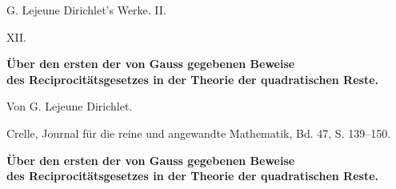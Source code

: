 \documentclass[11pt]{article}
\begin{document}
\begin{center}
{\Large G. Lejeune Dirichlet's Werke. II.}\par\vspace{1.2em}
{\Large XII.}\par\vspace{0.5em}
{\LARGE \textbf{Über den ersten der von Gauss gegebenen Beweise\\ des Reciprocitätsgesetzes in der Theorie der quadratischen Reste.}}\par\vspace{1em}
{\large Von G. Lejeune Dirichlet.}\par\vspace{0.5em}
{\small Crelle, Journal für die reine und angewandte Mathematik, Bd. 47, S. 139--150.}
\end{center}

\begin{center}
{\large \textbf{Über den ersten der von Gauss gegebenen Beweise\\ des Reciprocitätsgesetzes in der Theorie der quadratischen Reste.}}
\end{center}
\end{document}
